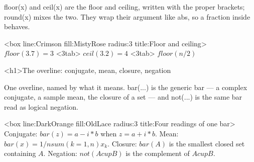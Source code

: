 \documentclass[
  margins=18,
  font=Latin Modern Roman,
  size=12,
  linespread=1.4,
  lang=en
]{scholatex}
\begin{document}
floor(x) and ceil(x) are the floor and ceiling, written with the
proper brackets; round(x) mixes the two. They wrap their argument like
abs, so a fraction inside behaves.

<box line:Crimson fill:MistyRose radius:3 title:{Floor and ceiling}>{
	$floor(3.7) = 3$ <3tab> $ceil(3.2) = 4$ <3tab> $floor(n/2)$
}

<h1>The overline: conjugate, mean, closure, negation

One overline, named by what it means. bar(...) is the generic bar — a
complex conjugate, a sample mean, the closure of a set — and not(...) is
the same bar read as logical negation.

<box line:DarkOrange fill:OldLace radius:3 title:{Four readings of one bar}>{
	Conjugate: $bar(z) = a - i*b$ when $z = a + i*b$.
	Mean: $bar(x) = 1/n sum(k=1, n) x_k$.
	Closure: $bar(A)$ is the smallest closed set containing $A$.
	Negation: $not(A cup B)$ is the complement of $A cup B$.
}
\end{document}
